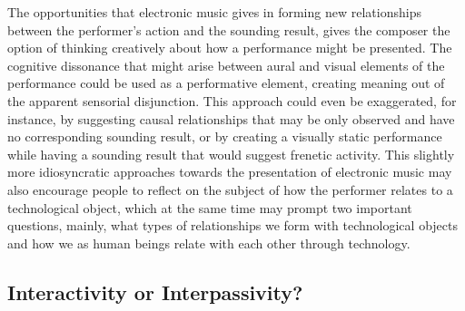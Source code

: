 The opportunities that electronic music gives in forming new relationships between the performer's action and the sounding result, gives the composer the option of thinking creatively about how a performance might be presented. The cognitive dissonance that might arise between aural and visual elements of the performance could be used as a performative element, creating meaning out of the apparent sensorial disjunction. This approach could even be exaggerated, for instance, by suggesting causal relationships that may be only observed and have no corresponding sounding result, or by creating a visually static performance while having a sounding result that would suggest frenetic activity. This slightly more idiosyncratic approaches towards the presentation of electronic music may also encourage people to reflect on the subject of how the performer relates to a technological object, which at the same time may prompt two important questions, mainly, what types of relationships we form with technological objects and how we as human beings relate with each other through technology.

\subsection{Interactivity or Interpassivity?}
 
